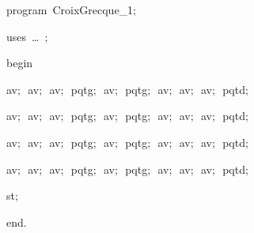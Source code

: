 
{
\parindent {}
\medskip

\carrenoir
\vspace{\neglskip}\mbox{\blc  \idt  \mcl program\idt \ CroixGrecque\_1$;$
}\par 
\vspace{\neglskip}\mbox{\blc \blk\idt \mcl uses\idt \ \ldots\ $;$
}\par 
\vspace{\neglskip}\mbox{\blc  \idt  \mcl begin\idt }\par 
\vspace{\neglskip}\mbox{\blc  \blk\idt  av$;$\ av$;$\ av$;$\ pqtg$;$\ av$;$\ pqtg$;$\ av$;$\ av$;$\ av$;$\ pqtd$;$\ }\par 
\vspace{\neglskip}\mbox{\blc  \blk\idt  av$;$\ av$;$\ av$;$\ pqtg$;$\ av$;$\ pqtg$;$\ av$;$\ av$;$\ av$;$\ pqtd$;$\ }\par 
\vspace{\neglskip}\mbox{\blc  \blk\idt  av$;$\ av$;$\ av$;$\ pqtg$;$\ av$;$\ pqtg$;$\ av$;$\ av$;$\ av$;$\ pqtd$;$\ }\par 
\vspace{\neglskip}\mbox{\blc  \blk\idt  av$;$\ av$;$\ av$;$\ pqtg$;$\ av$;$\ pqtg$;$\ av$;$\ av$;$\ av$;$\ pqtd$;$\ }\par 
\vspace{\neglskip}\mbox{\blc  \blk\idt  st$;$\ }\par 
\vspace{\neglskip}\mbox{\blc  \idt  \mcl end\idt $.$}\par 

\medskip }

